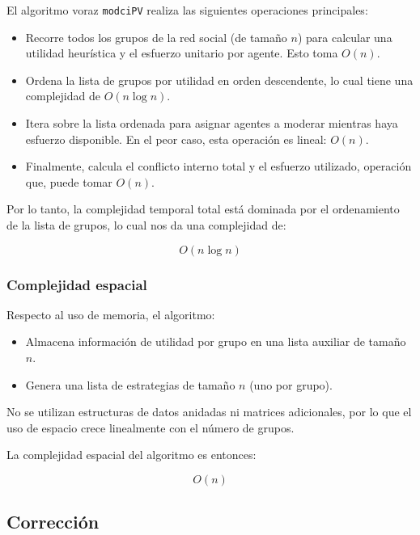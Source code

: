 \documentclass[11pt,letter]{article}
\begin{document}
    El algoritmo voraz \texttt{modciPV} realiza las siguientes operaciones principales:

    \begin{itemize}
        \item Recorre todos los grupos de la red social (de tamaño $n$) para calcular una utilidad heurística y el esfuerzo unitario por agente. Esto toma ${O}(n)$.
        \item Ordena la lista de grupos por utilidad en orden descendente, lo cual tiene una complejidad de ${O}(n \log n)$.
        \item Itera sobre la lista ordenada para asignar agentes a moderar mientras haya esfuerzo disponible. En el peor caso, esta operación es lineal: ${O}(n)$.
        \item Finalmente, calcula el conflicto interno total y el esfuerzo utilizado, operación que, puede tomar ${O}(n)$.
    \end{itemize}

    Por lo tanto, la complejidad temporal total está dominada por el ordenamiento de la lista de grupos, lo cual nos da una complejidad de:

    \[
            {O}(n \log n)
    \]

    \subsubsection{Complejidad espacial}

    Respecto al uso de memoria, el algoritmo:

    \begin{itemize}
        \item Almacena información de utilidad por grupo en una lista auxiliar de tamaño $n$.
        \item Genera una lista de estrategias de tamaño $n$ (uno por grupo).
    \end{itemize}

    No se utilizan estructuras de datos anidadas ni matrices adicionales, por lo que el uso de espacio crece linealmente con el número de grupos.

    La complejidad espacial del algoritmo es entonces:

    \[
            {O}(n)
    \]

    \subsection{Corrección}
\end{document}

